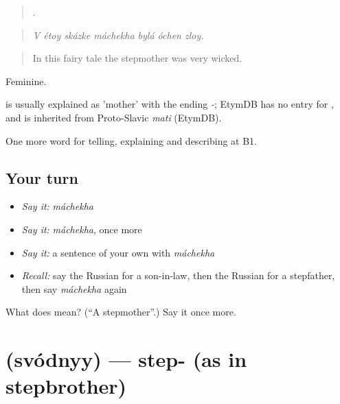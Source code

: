 \begin{quote}
      .
\end{quote}

\begin{quote}
\emph{V étoy skázke máchekha bylá óchen zloy.}
\end{quote}

\begin{quote}
In this fairy tale the stepmother was very wicked.
\end{quote}

Feminine.

\begin{cousinweb}
\emph{} is usually explained as \emph{} 'mother' with the ending \emph{-}; EtymDB has no entry for \emph{}, and \emph{} is inherited from Proto-Slavic \emph{mati} (EtymDB).
\end{cousinweb}

\begin{grammarlens}[title={What you've built}]
One more word for telling, explaining and describing at B1.
\end{grammarlens}

\subsection*{Your turn}
\begin{itemize}
\raggedright
  \item \emph{Say it:} \emph{máchekha}
  \item \emph{Say it:} \emph{máchekha}, once more
  \item \emph{Say it:} a sentence of your own with \emph{máchekha}
  \item \emph{Recall:} say the Russian for a son-in-law, then the Russian for a stepfather, then say \emph{máchekha} again
\end{itemize}

\begin{tcolorbox}[breakable,colback=teal!4,colframe=teal!35!black,title={Before you move on}]
What does  mean? (\textquotedblleft{}A stepmother\textquotedblright{}.) Say it once more.
\end{tcolorbox}
\section[\texorpdfstring{\ru{сводный} (svódnyy)}{сводный (svódnyy)}]{ (svódnyy) — step- (as in stepbrother)}


